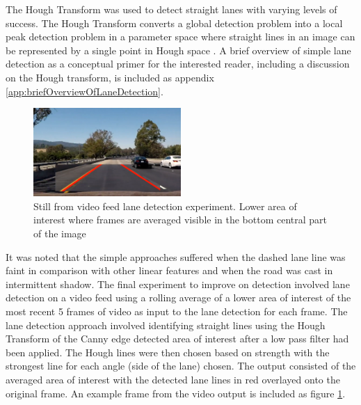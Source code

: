 \documentclass[]{aiaa-tc}%
\begin{document}
The Hough Transform was used to detect straight lanes with varying levels of success. The Hough Transform converts a global detection problem into a local peak detection problem in a parameter space \citep{surveyOfHT} where straight lines in an image can be represented by a single point in Hough space \citep{houghPaper}. A brief overview of simple lane detection as a conceptual primer for the interested reader, including a discussion on the Hough transform, is included as appendix \ref{app:briefOverviewOfLaneDetection}.

\begin{figure} %
	\centering
	\includegraphics[width=0.5\textwidth, height=0.5\textwidth]{early_lane_detection_experiment.png}
	\caption{Still from video feed lane detection experiment. Lower area of interest where frames are averaged visible in the bottom central part of the image}
	\label{f:simpleLaneDetectionHough}
\end{figure}

It was noted that the simple approaches suffered when the dashed lane line was faint in comparison with other linear features and when the road was cast in intermittent shadow. The final experiment to improve on detection involved lane detection on a video feed using a rolling average of a lower area of interest of the most recent 5 frames of video as input to the lane detection for each frame. The lane detection approach involved identifying straight lines using the Hough Transform of the Canny edge detected area of interest after a low pass filter had been applied. The Hough lines were then chosen based on strength with the strongest line for each angle (side of the lane) chosen. The output consisted of the averaged area of interest with the detected lane lines in red overlayed onto the original frame. An example frame from the video output is included as figure \ref{f:simpleLaneDetectionHough}. 
\end{document}
